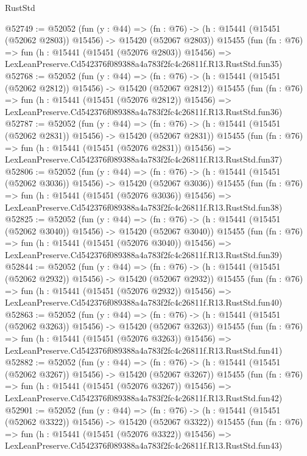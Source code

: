 \begin{lexlean}{RustStd}
\begin{coremodule}
@52749 := @52052
    (fun (y : @44) =>
    (fn : @76) -> (h : @15441 (@15451 (@52062 @2803)) @15456) -> @15420 (@52067 @2803))
    @15455
    (fun (fn : @76) =>
    fun (h : @15441 (@15451 (@52076 @2803)) @15456) =>
    LexLeanPreserve.Cd542376f089388a4a783f2fc4c26811f.R13.RustStd.fun35)
@52768 := @52052
    (fun (y : @44) =>
    (fn : @76) -> (h : @15441 (@15451 (@52062 @2812)) @15456) -> @15420 (@52067 @2812))
    @15455
    (fun (fn : @76) =>
    fun (h : @15441 (@15451 (@52076 @2812)) @15456) =>
    LexLeanPreserve.Cd542376f089388a4a783f2fc4c26811f.R13.RustStd.fun36)
@52787 := @52052
    (fun (y : @44) =>
    (fn : @76) -> (h : @15441 (@15451 (@52062 @2831)) @15456) -> @15420 (@52067 @2831))
    @15455
    (fun (fn : @76) =>
    fun (h : @15441 (@15451 (@52076 @2831)) @15456) =>
    LexLeanPreserve.Cd542376f089388a4a783f2fc4c26811f.R13.RustStd.fun37)
@52806 := @52052
    (fun (y : @44) =>
    (fn : @76) -> (h : @15441 (@15451 (@52062 @3036)) @15456) -> @15420 (@52067 @3036))
    @15455
    (fun (fn : @76) =>
    fun (h : @15441 (@15451 (@52076 @3036)) @15456) =>
    LexLeanPreserve.Cd542376f089388a4a783f2fc4c26811f.R13.RustStd.fun38)
@52825 := @52052
    (fun (y : @44) =>
    (fn : @76) -> (h : @15441 (@15451 (@52062 @3040)) @15456) -> @15420 (@52067 @3040))
    @15455
    (fun (fn : @76) =>
    fun (h : @15441 (@15451 (@52076 @3040)) @15456) =>
    LexLeanPreserve.Cd542376f089388a4a783f2fc4c26811f.R13.RustStd.fun39)
@52844 := @52052
    (fun (y : @44) =>
    (fn : @76) -> (h : @15441 (@15451 (@52062 @2932)) @15456) -> @15420 (@52067 @2932))
    @15455
    (fun (fn : @76) =>
    fun (h : @15441 (@15451 (@52076 @2932)) @15456) =>
    LexLeanPreserve.Cd542376f089388a4a783f2fc4c26811f.R13.RustStd.fun40)
@52863 := @52052
    (fun (y : @44) =>
    (fn : @76) -> (h : @15441 (@15451 (@52062 @3263)) @15456) -> @15420 (@52067 @3263))
    @15455
    (fun (fn : @76) =>
    fun (h : @15441 (@15451 (@52076 @3263)) @15456) =>
    LexLeanPreserve.Cd542376f089388a4a783f2fc4c26811f.R13.RustStd.fun41)
@52882 := @52052
    (fun (y : @44) =>
    (fn : @76) -> (h : @15441 (@15451 (@52062 @3267)) @15456) -> @15420 (@52067 @3267))
    @15455
    (fun (fn : @76) =>
    fun (h : @15441 (@15451 (@52076 @3267)) @15456) =>
    LexLeanPreserve.Cd542376f089388a4a783f2fc4c26811f.R13.RustStd.fun42)
@52901 := @52052
    (fun (y : @44) =>
    (fn : @76) -> (h : @15441 (@15451 (@52062 @3322)) @15456) -> @15420 (@52067 @3322))
    @15455
    (fun (fn : @76) =>
    fun (h : @15441 (@15451 (@52076 @3322)) @15456) =>
    LexLeanPreserve.Cd542376f089388a4a783f2fc4c26811f.R13.RustStd.fun43)

\end{coremodule}
\end{lexlean}
